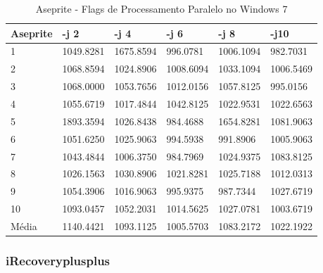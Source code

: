 \begin{table}[!ht]
\centering
\tiny
\caption{Aseprite - Flags de Processamento Paralelo no Windows 7}
\label{tab:flag_processamento_paralelo:windows:aseprite}
\begin{tabular}{llllll}
\textbf{Aseprite} & \textbf{-j 2} & \textbf{-j 4} & \textbf{-j 6} & \textbf{-j 8} & \textbf{-j10}  \\ \toprule
1                 & 1049.8281     &   1675.8594   &   996.0781    &   1006.1094   &   982.7031     \\ 
2                 & 1068.8594     &   1024.8906   &   1008.6094   &   1033.1094   &   1006.5469    \\ 
3                 & 1068.0000     &   1053.7656   &   1012.0156   &   1057.8125   &   995.0156     \\ 
4                 & 1055.6719     &   1017.4844   &   1042.8125   &   1022.9531   &   1022.6563    \\ 
5                 & 1893.3594     &   1026.8438   &   984.4688    &   1654.8281   &   1081.9063    \\ 
6                 & 1051.6250     &   1025.9063   &   994.5938    &   991.8906    &   1005.9063    \\ 
7                 & 1043.4844     &   1006.3750   &   984.7969    &   1024.9375   &   1083.8125    \\ 
8                 & 1026.1563     &   1030.8906   &   1021.8281   &   1025.7188   &   1012.0313    \\ 
9                 & 1054.3906     &   1016.9063   &   995.9375    &   987.7344    &   1027.6719    \\ 
10                & 1093.0457     &   1052.2031   &   1014.5625   &   1027.0781   &   1003.6719    \\ \bottomrule
Média             & 1140.4421     &   1093.1125   &   1005.5703   &   1083.2172   &   1022.1922    \\ 
\end{tabular}
\end{table}

\clearpage
\subsubsection*{iRecoveryplusplus}

